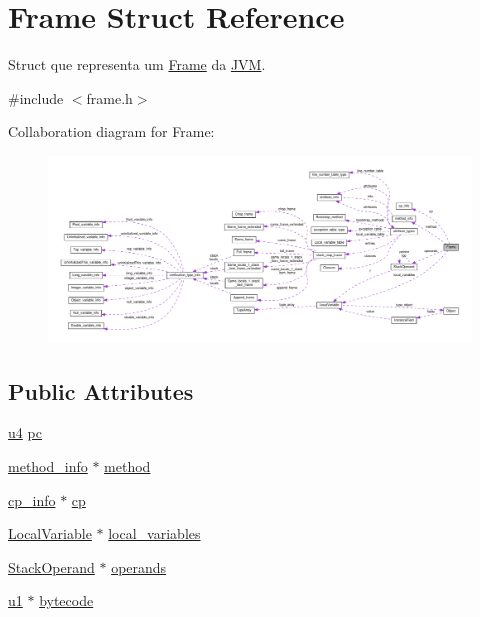 \hypertarget{structFrame}{}\section{Frame Struct Reference}
\label{structFrame}


Struct que representa um \hyperlink{structFrame}{Frame} da \hyperlink{structJVM}{J\+VM}.  




{\ttfamily \#include $<$frame.\+h$>$}



Collaboration diagram for Frame\+:
\nopagebreak
\begin{figure}[H]
\begin{center}
\leavevmode
\includegraphics[width=350pt]{structFrame__coll__graph}
\end{center}
\end{figure}
\subsection*{Public Attributes}
\begin{DoxyCompactItemize}
\item 
\hyperlink{structures_8h_ae391a1d79bb0c8cbc283f0283e3c098b}{u4} \hyperlink{structFrame_ada6a6cf76d00cbadf43a86a686dd026c}{pc}
\item 
\hyperlink{structmethod__info}{method\+\_\+info} $\ast$ \hyperlink{structFrame_af0943cac72b53aa5aa67f3e7097430a1}{method}
\item 
\hyperlink{structcp__info}{cp\+\_\+info} $\ast$ \hyperlink{structFrame_ada1bd832b6f72f87a35d88c68b9a188a}{cp}
\item 
\hyperlink{structLocalVariable}{Local\+Variable} $\ast$ \hyperlink{structFrame_a1a3968ae645e9c154229a2631639ebd5}{local\+\_\+variables}
\item 
\hyperlink{structStackOperand}{Stack\+Operand} $\ast$ \hyperlink{structFrame_ab311fc7762ab460f039e58b024c4d229}{operands}
\item 
\hyperlink{structures_8h_a64f8055b64cf2a4c299c841130c5c938}{u1} $\ast$ \hyperlink{structFrame_ad3bdd8cc30352e62af5898b699d54c16}{bytecode}
\end{DoxyCompactItemize}


